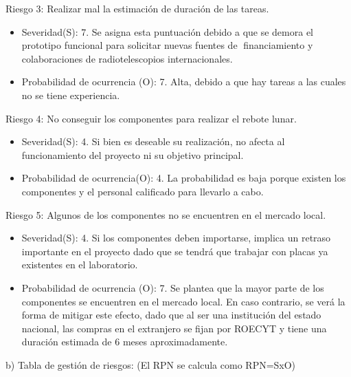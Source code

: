 \documentclass[11pt, %
codirector, %
]{charter}
\begin{document}
Riesgo 3: Realizar mal la estimación de duración de las tareas. 
\begin{itemize}
	\item Severidad(S): 7.\newline 
	Se asigna esta puntuación debido a que se demora el prototipo funcional para solicitar nuevas fuentes de financiamiento y colaboraciones de radiotelescopios internacionales.
	\item Probabilidad de ocurrencia (O): 7.\newline 
	Alta, debido a que hay tareas a las cuales no se tiene experiencia.
\end{itemize}


Riesgo 4: No conseguir los componentes para realizar el rebote lunar. 
\begin{itemize}
	\item Severidad(S): 4.\newline 
		Si bien es deseable su realización, no afecta al funcionamiento del proyecto ni su objetivo principal. 
	\item Probabilidad de ocurrencia(O): 4.\newline 
		La probabilidad es baja porque existen los componentes y el personal calificado para llevarlo a cabo. 
\end{itemize}

Riesgo 5: Algunos de los componentes no se encuentren en el mercado local. 
\begin{itemize}
	\item Severidad(S): 4.\newline 
		Si los componentes deben importarse, implica un retraso importante en el proyecto dado que se tendrá que trabajar con placas ya existentes en el laboratorio. 

	\item Probabilidad de ocurrencia (O): 7. \newline 
	   Se plantea que la mayor parte de los componentes se encuentren en el mercado local. En caso contrario, se verá la forma de mitigar este efecto, dado que al ser una institución del estado nacional, las compras en el extranjero se fijan por ROECYT y tiene una duración estimada de 6 meses aproximadamente. 
\end{itemize}





b) Tabla de gestión de riesgos:      (El RPN se calcula como RPN=SxO)
\end{document}
